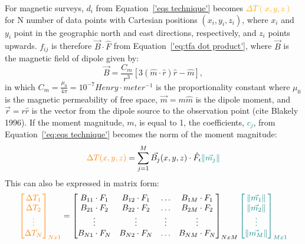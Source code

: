 For magnetic surveys, {$d_i$} from Equation~\ref{'eqs technique'} becomes \textcolor{orange}{$\Delta T(x, y, z)$} for N number of data points with Cartesian positions $(x_i, y_i, z_i)$, where $x_i$ and $y_i$ point in the geographic north and east directions, respectively, and $z_i$ points upwards. $f_{ij}$ is therefore $\vec{B} \cdot \hat{F}$ from Equation~\ref{'eq:tfa dot product'}, where $\vec{B}$ is the magnetic field of dipole given by:
\begin{equation}
    \vec{B} = \frac{C_m}{r^3} [3 ( \hat{m} \cdot \hat{r}) \hat{r} - \hat{m}],
\end{equation}
in which $C_m = \frac{\mu_0}{4 \pi} = 10^{-7} Henry \cdot meter^{-1}$ is the proportionality constant where $\mu_0$ is the magnetic permeability of free space, $ \vec{m} = m \hat{m}$ is the dipole moment, and $\vec{r} = r \hat{r} $ is the vector from the dipole source to the observation point (cite Blakely 1996). If the moment magnitude, $m$, is equal to 1, the coefficients, \textcolor{teal}{$c_j$}, from Equation~\ref{'eq:eqs technique'} becomes the norm of the moment magnitude:
\begin{equation}
\textcolor{orange}{\Delta T (x, y, z)} = \sum_{j=1}^{M}  \vec{B_j}(x, y, z) \cdot \hat{F_i} \textcolor{teal}{\left\lVert \vec{m_j} \right\rVert}
\end{equation}
This can also be expressed in matrix form:
\begin{equation}
\textcolor{orange}{\begin{bmatrix}
    \Delta T_1 \\ \Delta T_2 \\ \vdots \\ \Delta T_N
\end{bmatrix}_{Nx1}} = \begin{bmatrix}
    B_{11} \cdot F_{1} & B_{12} \cdot F_{1} & \hdots & B_{1M} \cdot F_{1} \\
    B_{21} \cdot F_{2} & B_{22} \cdot F_{2} & \hdots & B_{2M} \cdot F_{2} \\
    \vdots & \vdots & \vdots & \vdots \\
    B_{N1} \cdot F_{N} & B_{N2} \cdot F_{N} & \hdots & B_{NM} \cdot F_{N} \\
\end{bmatrix}_{NxM} \textcolor{teal}{\begin{bmatrix}
    \left\lVert \vec{m_1} \right\rVert \\ \left\lVert \vec{m_2} \right\rVert \\ \vdots \\ \left\lVert \vec{m_M} \right\rVert
\end{bmatrix}_{Mx1}}
\end{equation}
